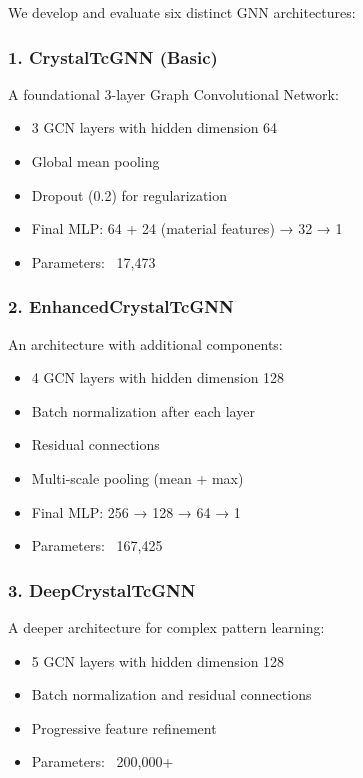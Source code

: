 \documentclass[11pt,a4paper]{article}
\begin{document}
We develop and evaluate six distinct GNN architectures:

\subsubsection{1. CrystalTcGNN (Basic)}

A foundational 3-layer Graph Convolutional Network:

\begin{itemize}
    \item 3 GCN layers with hidden dimension 64
    \item Global mean pooling
    \item Dropout (0.2) for regularization
    \item Final MLP: 64 + 24 (material features) → 32 → 1
    \item Parameters: ~17,473
\end{itemize}

\subsubsection{2. EnhancedCrystalTcGNN}

An architecture with additional components:

\begin{itemize}
    \item 4 GCN layers with hidden dimension 128
    \item Batch normalization after each layer
    \item Residual connections
    \item Multi-scale pooling (mean + max)
    \item Final MLP: 256 → 128 → 64 → 1
    \item Parameters: ~167,425
\end{itemize}

\subsubsection{3. DeepCrystalTcGNN}

A deeper architecture for complex pattern learning:

\begin{itemize}
    \item 5 GCN layers with hidden dimension 128
    \item Batch normalization and residual connections
    \item Progressive feature refinement
    \item Parameters: ~200,000+
\end{itemize}
\end{document}
